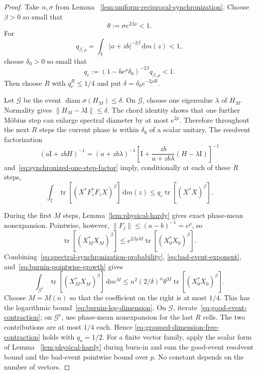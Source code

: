 \documentclass[11pt]{article}
\theoremstyle{remark}
\newcommand{\T}{\mathbb T}
\newcommand{\Id}{\mathrm I}
\newcommand{\dd}{\,\mathrm d}
\newcommand{\tr}{\operatorname{tr}}
\begin{document}
\begin{proof}
Take $\alpha,\sigma$ from Lemma
~\ref{lem:uniform-reciprocal-synchronization}.  Choose $\beta>0$ so small
that
\begin{equation}
 \theta:=\sigma e^{2\beta\rho}<1.
 \label{eq:bad-event-exponent}
\end{equation}
For
\[
 q_{\beta,\rho}=\int_\T|a+zb|^{-2\beta}\dd m(z)<1,
\]
choose $\delta_0>0$ so small that
\begin{equation}
 q_c:=(1-be^\rho\delta_0)^{-2\beta}q_{\beta,\rho}<1.
 \label{eq:synchronized-one-step-factor}
\end{equation}
Then choose $R$ with $q_c^R\leq1/4$ and put
$\delta=\delta_0e^{-2\rho R}$.

Let $\mathcal G$ be the event
$\operatorname{diam}\sigma(H_M)\leq\delta$.  On $\mathcal G$, choose one
eigenvalue $\lambda$ of $H_M$.  Normality gives
$\|H_M-\lambda\Id\|\leq\delta$.  The chord identity shows that one further
M\"obius step can enlarge spectral diameter by at most $e^{2\rho}$.
Therefore throughout the next $R$ steps the current phase is within
$\delta_0$ of a scalar unitary.  The resolvent factorization
\begin{equation}
 (a\Id+zbH)^{-1}
 =(a+zb\lambda)^{-1}
 \left[\Id+\frac{zb}{a+zb\lambda}(H-\lambda\Id)\right]^{-1}
 \label{eq:synchronized-resolvent-factorization}
\end{equation}
and~\eqref{eq:synchronized-one-step-factor} imply, conditionally at each of
these $R$ steps,
\begin{equation}
 \int_\T\tr[(X^*F_z^*F_zX)^\beta]\dd m(z)
 \leq q_c\tr[(X^*X)^\beta].
 \label{eq:good-event-contraction}
\end{equation}

During the first $M$ steps, Lemma~\ref{lem:physical-hardy} gives exact
phase-mean nonexpansion.  Pointwise, however,
$\|F_j\|\leq(a-b)^{-1}=e^\rho$, so
\begin{equation}
 \tr[(X_M^*X_M)^\beta]
 \leq e^{2\beta\rho M}\tr[(X_0^*X_0)^\beta].
 \label{eq:burnin-pointwise-growth}
\end{equation}
Combining~\eqref{eq:spectral-synchronization-probability},
\eqref{eq:bad-event-exponent}, and~\eqref{eq:burnin-pointwise-growth} gives
\begin{equation}
 \int_{\mathcal G^c}\tr[(X_M^*X_M)^\beta]\dd m^M
 \leq n^2(2/\delta)^\alpha\theta^M
       \tr[(X_0^*X_0)^\beta].
 \label{eq:bad-event-moment}
\end{equation}
Choose $M=M(n)$ so that the coefficient on the right is at most $1/4$.
This has the logarithmic bound~\eqref{eq:burnin-log-dimension}.  On
$\mathcal G$, iterate~\eqref{eq:good-event-contraction}; on
$\mathcal G^c$, use phase-mean nonexpansion for the last $R$ cells.  The two
contributions are at most $1/4$ each.  Hence
\eqref{eq:grouped-dimension-free-contraction} holds with $q_\star=1/2$.
For a finite vector family, apply the scalar form of Lemma
~\ref{lem:physical-hardy} during burn-in and sum the good-event resolvent
bound and the bad-event pointwise bound over $p$.  No constant depends on the
number of vectors.
\end{proof}
\end{document}
